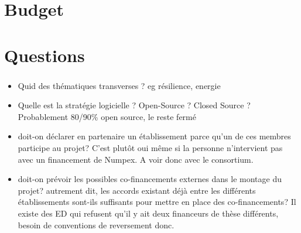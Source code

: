 \section{Budget}

\begin{frame}
  \frametitle{\insertsectionhead}

  
  

\end{frame}
\section{Questions}

\begin{frame}
  \frametitle{\insertsectionhead}  

  \begin{itemize}
    \item Quid des thématiques transverses ? eg résilience, energie 
    \item Quelle est la stratégie logicielle ? Open-Source ? Closed Source ? Probablement 80/90\% open source, le reste fermé
    \item doit-on déclarer en partenaire un établissement parce qu'un de ces membres participe au projet? C'est plutôt oui même si la personne n'intervient pas avec un financement de Numpex. A voir donc avec le consortium.
    \item doit-on prévoir les possibles co-financements externes dans le montage du projet? autrement dit, les accords existant déjà entre les différents établissements sont-ils suffisants pour mettre en place des co-financements? Il existe des ED qui refusent qu'il y ait deux financeurs de thèse différents, besoin de conventions de reversement donc.
  \end{itemize}

  

\end{frame}

\appendix
